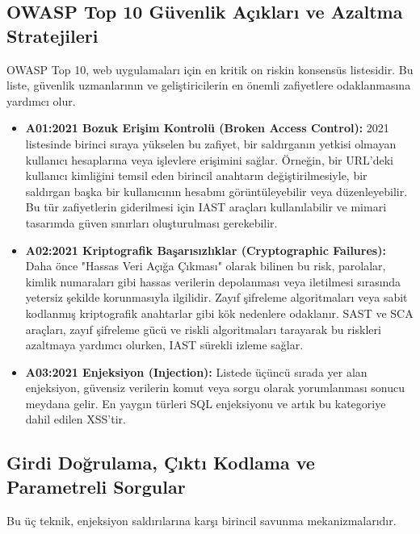 \subsection{OWASP Top 10 Güvenlik Açıkları ve Azaltma Stratejileri}

OWASP Top 10, web uygulamaları için en kritik on riskin konsensüs listesidir. Bu liste, güvenlik uzmanlarının ve geliştiricilerin en önemli zafiyetlere odaklanmasına yardımcı olur.

\begin{itemize}
\item \textbf{A01:2021 Bozuk Erişim Kontrolü (Broken Access Control):} 2021 listesinde birinci sıraya yükselen bu zafiyet, bir saldırganın yetkisi olmayan kullanıcı hesaplarına veya işlevlere erişimini sağlar. Örneğin, bir URL'deki kullanıcı kimliğini temsil eden birincil anahtarın değiştirilmesiyle, bir saldırgan başka bir kullanıcının hesabını görüntüleyebilir veya düzenleyebilir. Bu tür zafiyetlerin giderilmesi için IAST araçları kullanılabilir ve mimari tasarımda güven sınırları oluşturulması gerekebilir.
\item \textbf{A02:2021 Kriptografik Başarısızlıklar (Cryptographic Failures):} Daha önce "Hassas Veri Açığa Çıkması" olarak bilinen bu risk, parolalar, kimlik numaraları gibi hassas verilerin depolanması veya iletilmesi sırasında yetersiz şekilde korunmasıyla ilgilidir. Zayıf şifreleme algoritmaları veya sabit kodlanmış kriptografik anahtarlar gibi kök nedenlere odaklanır. SAST ve SCA araçları, zayıf şifreleme gücü ve riskli algoritmaları tarayarak bu riskleri azaltmaya yardımcı olurken, IAST sürekli izleme sağlar.
\item \textbf{A03:2021 Enjeksiyon (Injection):} Listede üçüncü sırada yer alan enjeksiyon, güvensiz verilerin komut veya sorgu olarak yorumlanması sonucu meydana gelir. En yaygın türleri SQL enjeksiyonu ve artık bu kategoriye dahil edilen XSS'tir.
\end{itemize}

\subsection{Girdi Doğrulama, Çıktı Kodlama ve Parametreli Sorgular}

Bu üç teknik, enjeksiyon saldırılarına karşı birincil savunma mekanizmalarıdır.

